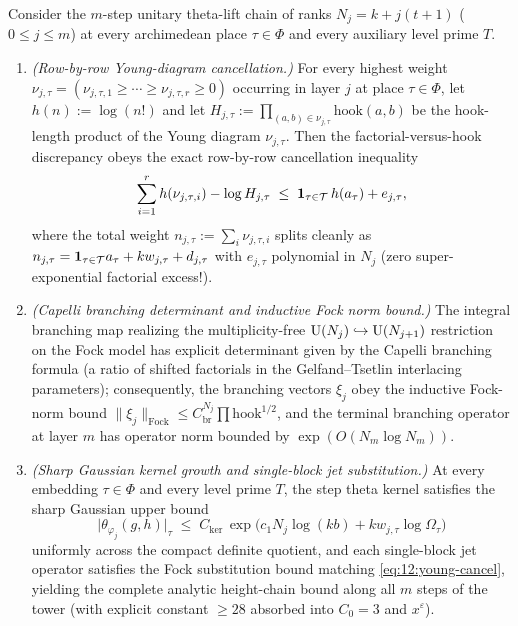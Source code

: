 \begin{theorem}
\label{thm:12:analytic-size}
Consider the $m$-step unitary theta-lift chain of ranks $N_j = k + j(t+1)$ ($0 \le j \le m$) at every archimedean place $\tau \in \Phi$ and every auxiliary level prime $T$.
\begin{enumerate}[label=\textup{(\roman*)}]
\item \emph{(Row-by-row Young-diagram cancellation.)} For every highest weight $\nu_{j,\tau} = (\nu_{j,\tau,1} \ge \cdots \ge \nu_{j,\tau,r} \ge 0)$ occurring in layer $j$ at place $\tau \in \Phi$, let $h(n) := \log(n!)$ and let $H_{j,\tau} := \prod_{(a,b) \in \nu_{j,\tau}} \mathrm{hook}(a, b)$ be the hook-length product of the Young diagram $\nu_{j,\tau}$. Then the factorial-versus-hook discrepancy obeys the exact row-by-row cancellation inequality
  \begin{equation}
  \label{eq:12:young-cancel}
    \sum_{i=1}^r h(\nu_{j,\tau,i}) - \log H_{j,\tau}
    \;\le\; \mathbf{1}_{\tau \in \mathcal{T}}\, h(a_\tau) + e_{j,\tau},
  \end{equation}
  where the total weight $n_{j,\tau} := \sum_i \nu_{j,\tau,i}$ splits cleanly as $n_{j,\tau} = \mathbf{1}_{\tau \in \mathcal{T}} a_\tau + k w_{j,\tau} + d_{j,\tau}$ with $e_{j,\tau}$ polynomial in $N_j$ (zero super-exponential factorial excess!).
\item \emph{(Capelli branching determinant and inductive Fock norm bound.)} The integral branching map realizing the multiplicity-free $\mathrm{U}(N_j) \hookrightarrow \mathrm{U}(N_{j+1})$ restriction on the Fock model has explicit determinant given by the Capelli branching formula (a ratio of shifted factorials in the Gelfand--Tsetlin interlacing parameters); consequently, the branching vectors $\xi_j$ obey the inductive Fock-norm bound $\|\xi_j\|_{\mathrm{Fock}} \le C_{\mathrm{br}}^{N_j} \prod \mathrm{hook}^{1/2}$, and the terminal branching operator at layer $m$ has operator norm bounded by $\exp(O(N_m \log N_m))$.
\item \emph{(Sharp Gaussian kernel growth and single-block jet substitution.)} At every embedding $\tau \in \Phi$ and every level prime $T$, the step theta kernel satisfies the sharp Gaussian upper bound
  \begin{equation}
  \label{eq:12:sharp-gauss}
    \bigl|\theta_{\varphi_j}(g, h)\bigr|_\tau
    \;\le\; C_{\mathrm{ker}}\, \exp\!\bigl(c_1 N_j \log(k b) + k w_{j,\tau} \log\Omega_\tau\bigr)
  \end{equation}
  uniformly across the compact definite quotient, and each single-block jet operator satisfies the Fock substitution bound matching \eqref{eq:12:young-cancel}, yielding the complete analytic height-chain bound along all $m$ steps of the tower (with explicit constant $\ge 28$ absorbed into $C_0 = 3$ and $x^\varepsilon$).
\end{enumerate}
\end{theorem}
